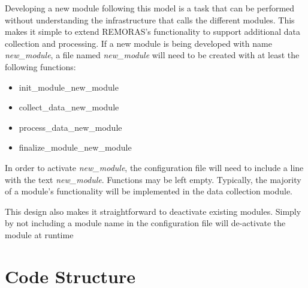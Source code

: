 \documentclass[10pt,a4paper]{report}
\begin{document}
Developing a new module following this model is a task that can be performed without understanding 
the infrastructure that calls the different modules.
This makes it simple to extend REMORAS's functionality to
support additional data collection and processing. If a new module is being developed with 
name \textit{new\_module}, a file named \textit{new\_module} will need to be created with at 
least the following functions:

\begin{itemize}
	\item init\_module\_new\_module
	\item collect\_data\_new\_module
	\item process\_data\_new\_module
	\item finalize\_module\_new\_module
\end{itemize}

In order to activate \emph{new\_module}, the configuration file will need to include a line
with the text \textit{new\_module}. Functions may be left empty. Typically, the majority of 
a module's functionality will be implemented in the data collection module.

This design also makes it straightforward to deactivate existing modules.
Simply by not including a module name in the configuration file will de-activate the module at runtime

\FloatBarrier
\section{Code Structure}
\end{document}
